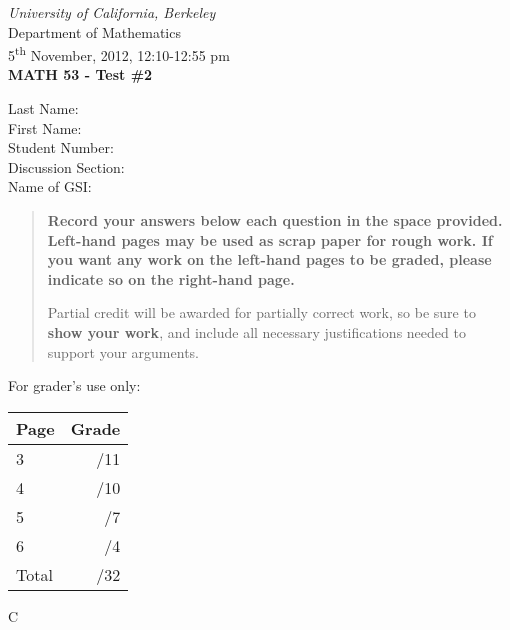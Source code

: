 \documentclass[12pt]{article}
\newcommand{\skipline}{\vspace{12pt}}
\begin{document}
\author{Instructor: Sean Fitzpatrick}
\thispagestyle{plain}
\begin{center}
\emph{University of California, Berkeley}\\
Department of Mathematics\\
5\textsuperscript{th} November, 2012, 12:10-12:55 pm\\
{\bf MATH 53 - Test \#2}\\
\end{center}
\skipline \skipline \skipline \noindent \skipline
Last Name:\underline{\hspace{350pt}}\\
\skipline
First Name:\underline{\hspace{348pt}}\\
\skipline
Student Number:\underline{\hspace{322pt}}\\
\skipline
Discussion Section: \underline{\hspace{307pt}}\\
\skipline
Name of GSI: \underline{\hspace{336pt}}\\

\vspace{0.5in}


\begin{quote}
 {\bf Record your answers below each question in the space provided.    Left-hand pages may be used as scrap paper for rough work.  If you want any work on the left-hand pages to be graded, please indicate so on the right-hand page.
 
 \bigskip
 
Partial credit will be awarded for partially correct work, so be sure to {\bf show your work}, and include all necessary justifications needed to support your arguments.}
\end{quote}


\vspace{0.5in}

For grader's use only:

\begin{table}[hbt]
\begin{center}
\begin{tabular}{|l|r|} \hline
Page&Grade\\
\hline \hline
\cline{1-2} 3 & \enspace\enspace\enspace\enspace\enspace\enspace/11\\
\cline{1-2} 4 & \enspace\enspace\enspace\enspace\enspace\enspace/10\\
\cline{1-2} 5 & \enspace\enspace\enspace\enspace\enspace\enspace/7\\
\cline{1-2} 6 & \enspace\enspace\enspace\enspace\enspace\enspace/4\\
\cline{1-2} Total & \enspace\enspace\enspace\enspace\enspace\enspace/32\\
\hline
\end{tabular}

\skipline

\skipline

\skipline

\skipline

C
\end{center}
\end{table}
\newpage
\end{document}

